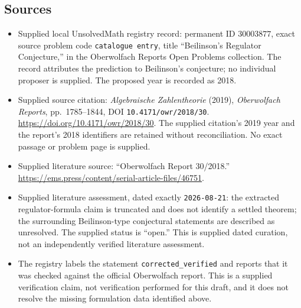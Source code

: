 \documentclass[11pt]{article}
\begin{document}
\subsection{Sources}
\begin{itemize}
\item Supplied local UnsolvedMath registry record: permanent ID \(30003877\), exact source problem code \texttt{catalogue entry}, title ``Beilinson's Regulator Conjecture,'' in the Oberwolfach Reports Open Problems collection. The record attributes the prediction to Beilinson's conjecture; no individual proposer is supplied. The proposed year is recorded as 2018.
\item Supplied source citation: \emph{Algebraische Zahlentheorie} (2019), \emph{Oberwolfach Reports}, pp.\ 1785--1844, DOI \texttt{10.4171/owr/2018/30}. \url{https://doi.org/10.4171/owr/2018/30}. The supplied citation's 2019 year and the report's 2018 identifiers are retained without reconciliation. No exact passage or problem page is supplied.
\item Supplied literature source: ``Oberwolfach Report 30/2018.'' \url{https://ems.press/content/serial-article-files/46751}.
\item Supplied literature assessment, dated exactly \texttt{2026-08-21}: the extracted regulator-formula claim is truncated and does not identify a settled theorem; the surrounding Beilinson-type conjectural statements are described as unresolved. The supplied status is ``open.'' This is supplied dated curation, not an independently verified literature assessment.
\item The registry labels the statement \texttt{corrected\_verified} and reports that it was checked against the official Oberwolfach report. This is a supplied verification claim, not verification performed for this draft, and it does not resolve the missing formulation data identified above.
\end{itemize}
\end{document}
